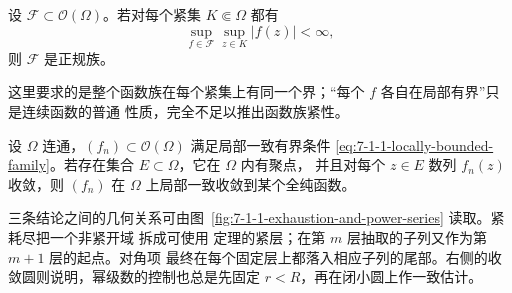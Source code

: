 \begin{theorem}[Montel 定理]\label{theorem:7-1-1-3}
设 $\mathcal F\subset\mathcal O(\Omega)$。若对每个紧集 $K\Subset\Omega$ 都有
\[
  \sup_{f\in\mathcal F}\sup_{z\in K}|f(z)|<\infty,
  \tag{7.1.2}\label{eq:7-1-1-locally-bounded-family}
\]
则 $\mathcal F$ 是正规族。
\end{theorem}

这里要求的是整个函数族在每个紧集上有同一个界；“每个 $f$ 各自在局部有界”只是连续函数的普通
性质，完全不足以推出函数族紧性。

\begin{proposition}\label{proposition:7-1-1-4}
设 $\Omega$ 连通，$(f_n)\subset\mathcal O(\Omega)$ 满足局部一致有界条件
\eqref{eq:7-1-1-locally-bounded-family}。若存在集合 $E\subset\Omega$，它在 $\Omega$ 内有聚点，
并且对每个 $z\in E$ 数列 $f_n(z)$ 收敛，则 $(f_n)$ 在 $\Omega$ 上局部一致收敛到某个全纯函数。
\end{proposition}

三条结论之间的几何关系可由图~\ref{fig:7-1-1-exhaustion-and-power-series} 读取。紧耗尽把一个非紧开域
拆成可使用 \ArzelaAscoli{} 定理的紧层；在第 $m$ 层抽取的子列又作为第 $m+1$ 层的起点。对角项
最终在每个固定层上都落入相应子列的尾部。右侧的收敛圆则说明，幂级数的控制也总是先固定
$r<R$，再在闭小圆上作一致估计。

